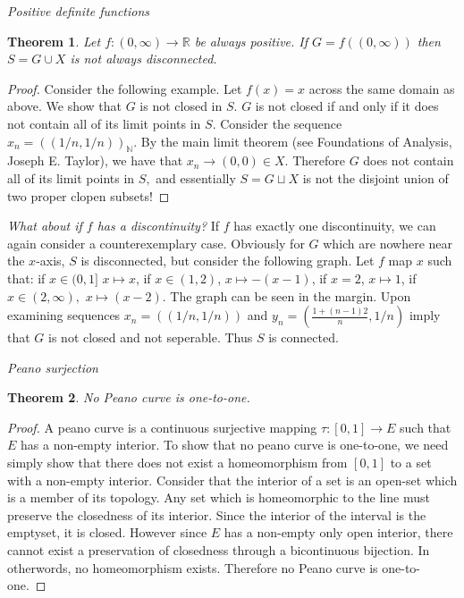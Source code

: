 \documentclass[letter]{article}
\newtheorem{theorem}{Theorem}
\newenvironment{menumerate}{%
  \edef\backupindent{\the\parindent}%
  \enumerate%
  \setlength{\parindent}{\backupindent}%
}{\endenumerate}
\begin{document}
\begin{menumerate}
\begin{menumerate}
			\item \emph{Positive definite functions}
			\begin{theorem}
				Let $f:(0,\infty) \to \mathbb{R}$ be always positive. If $G = f((0,\infty))$ then $S = G \cup X$ is not always disconnected.
			\end{theorem}
			\begin{proof}
				Consider the following example. Let $f(x) = x$ across the same domain as above. We show that $G$ is not closed in $S.$ $G$ is not closed if and only if it does not contain all of its limit points in $S.$ Consider the sequence $x_n = ((1/n,1/n))_\mathbb{N}.$ By the main limit theorem (see Foundations of Analysis, Joseph E. Taylor), we have that $x_n \to (0,0) \in X.$ Therefore $G$ does not contain all of its limit points in $S,$ and essentially $S = G \sqcup X$ is not the disjoint union of two proper clopen subsets!  
			\end{proof}
			\item \emph{What about if $f$ has a discontinuity?} If $f$ has exactly one discontinuity, we can again consider a counterexemplary case. Obviously for $G$ which are nowhere near the $x$-axis, $S$ is disconnected, but consider the following graph. Let $f$ map $x$ such that: if $x\in (0,1]$ $x\mapsto x$,  if $x \in (1,2)$, $x\mapsto -(x-1)$, if $x = 2$, $x\mapsto 1$, if $x \in (2,\infty), $ $x\mapsto (x-2).$ The graph can be seen in the margin. Upon examining sequences $x_n = ((1/n,1/n))$ and $y_n = (\frac{1+(n-1)2}{n},1/n)$ imply that $G$ is not closed and not seperable. Thus $S$ is connected.
 		\end{menumerate}
	\setcounter{enumi}{101}
	\item \emph{Peano surjection}
		\begin{theorem}
			No Peano curve is one-to-one.
		\end{theorem}
		\begin{proof}
			A peano curve is a continuous surjective mapping $\tau: [0,1] \to E$ such that $E$ has a non-empty interior. To show that no peano curve is one-to-one, we need simply show that there does not exist a homeomorphism from $[0,1]$ to a set with a non-empty interior. Consider that the interior of a set is an open-set which is a member of its topology. Any set which is homeomorphic to the line must preserve the closedness of its interior. Since the interior of the interval is the emptyset, it is closed. However since $E$ has a non-empty only open interior, there cannot exist a preservation of closedness through a bicontinuous bijection. In otherwords, no homeomorphism exists. Therefore no Peano curve is one-to-one.

\end{proof}
\end{menumerate}
\end{document}
